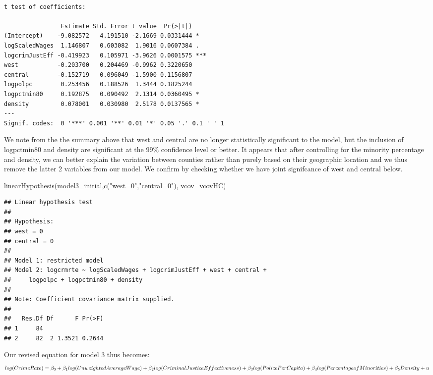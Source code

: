 \documentclass[]{article}
\newenvironment{Shaded}{}{}
\newcommand{\DataTypeTok}[1]{#1}
\newcommand{\KeywordTok}[1]{\textcolor[rgb]{0.00,0.00,1.00}{#1}}
\newcommand{\NormalTok}[1]{#1}
\newcommand{\StringTok}[1]{\textcolor[rgb]{0.00,0.50,0.50}{#1}}
\begin{document}
\begin{verbatim}

t test of coefficients:

                Estimate Std. Error t value  Pr(>|t|)    
(Intercept)    -9.082572   4.191510 -2.1669 0.0331444 *  
logScaledWages  1.146807   0.603082  1.9016 0.0607384 .  
logcrimJustEff -0.419923   0.105971 -3.9626 0.0001575 ***
west           -0.203700   0.204469 -0.9962 0.3220650    
central        -0.152719   0.096049 -1.5900 0.1156807    
logpolpc        0.253456   0.188526  1.3444 0.1825244    
logpctmin80     0.192875   0.090492  2.1314 0.0360495 *  
density         0.078001   0.030980  2.5178 0.0137565 *  
---
Signif. codes:  0 '***' 0.001 '**' 0.01 '*' 0.05 '.' 0.1 ' ' 1
\end{verbatim}

We note from the the summary above that west and central are no longer
statistically significant to the model, but the inclusion of logpctmin80
and density are significant at the 99\% confidence level or better. It
appears that after controlling for the minority percentage and density,
we can better explain the variation between counties rather than purely
based on their geographic location and we thus remove the latter 2
variables from our model. We confirm by checking whether we have joint
signifcance of west and central below.

\begin{Shaded}
\begin{Highlighting}[]
\KeywordTok{linearHypothesis}\NormalTok{(model3_initial,}\KeywordTok{c}\NormalTok{(}\StringTok{"west=0"}\NormalTok{,}\StringTok{"central=0"}\NormalTok{), }\DataTypeTok{vcov=}\NormalTok{vcovHC)}
\end{Highlighting}
\end{Shaded}

\begin{verbatim}
## Linear hypothesis test
## 
## Hypothesis:
## west = 0
## central = 0
## 
## Model 1: restricted model
## Model 2: logcrmrte ~ logScaledWages + logcrimJustEff + west + central + 
##     logpolpc + logpctmin80 + density
## 
## Note: Coefficient covariance matrix supplied.
## 
##   Res.Df Df      F Pr(>F)
## 1     84                 
## 2     82  2 1.3521 0.2644
\end{verbatim}

Our revised equation for model 3 thus becomes:
\[log(CrimeRate) = \beta_0 + \beta_1log(UnweightedAverageWage) + \beta_2log(CriminalJusticeEffectiveness) +  \\ \beta_3log(PolicePerCapita) +\beta_4log(PercentageofMinorities) + \beta_5Density +u\]
\end{document}
